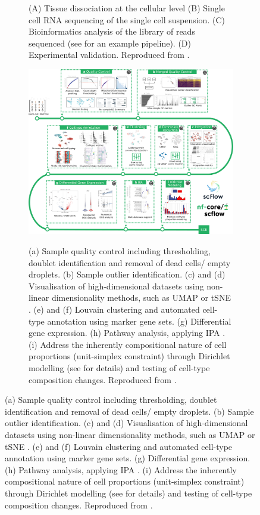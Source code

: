 \begin{figure}
\begin{subfigure}[p]{0.4\textwidth}
         \label{subfig:sc-pipeline}
         \caption[\textbf{Overview of a standard single cell RNA sequencing pipeline}]{(A) Tissue dissociation at the cellular level (B) Single cell RNA sequencing of the single cell suspension. (C) Bioinformatics analysis of the library of reads sequenced (see  for an example pipeline). (D) Experimental validation. Reproduced from \autocite[Fig. 2]{chavkin_hirschi20}.}
     \end{subfigure}
     \hfill
     \begin{subfigure}[p]{0.58\textwidth}
         \centering
         \includegraphics[width=\textwidth]{figures/biological_introduction/sc_computational_workflow.png}
         \label{subfig:sc-nextflow}
         \caption[\texttt{scflow}\textbf{: A Nextflow computational pipeline to analyse scRNA-Seq data}]{(a) Sample quality control including thresholding, doublet identification and removal of dead cells/ empty droplets. (b) Sample outlier identification. (c) and (d) Visualisation of high-dimensional datasets using non-linear dimensionality methods, such as UMAP \autocite{becht_etal19} or tSNE \autocite{maaten_hinton08}. (e) and (f) Louvain clustering \autocite{blondel_etal08} and automated cell-type annotation using marker gene sets. (g) Differential gene expression. (h) Pathway analysis, applying IPA \autocite{kramer_etal14}. (i) Address the inherently compositional nature of cell proportions (unit-simplex constraint) through Dirichlet modelling (see  for details) and testing of cell-type composition changes. Reproduced from \autocite{khozoie_etal21}.}    
        \end{subfigure}
\end{figure}

